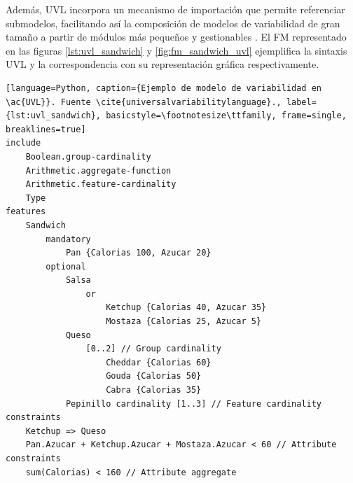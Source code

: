 Además, \ac{UVL} incorpora un mecanismo de importación que permite referenciar submodelos, 
facilitando así la composición de modelos de variabilidad de gran tamaño a partir de módulos 
más pequeños y gestionables \citep{universalvariabilitylanguage}. El \ac{FM} representado en 
las figuras \ref{lst:uvl_sandwich} y \ref{fig:fm_sandwich_uvl}
ejemplifica la sintaxis \ac{UVL} y la correspondencia con su representación gráfica respectivamente.

\begin{lstlisting}[language=Python, caption={Ejemplo de modelo de variabilidad en \ac{UVL}}. Fuente \cite{universalvariabilitylanguage}., label={lst:uvl_sandwich}, basicstyle=\footnotesize\ttfamily, frame=single, breaklines=true]
include
    Boolean.group-cardinality
    Arithmetic.aggregate-function
    Arithmetic.feature-cardinality
    Type
features
    Sandwich
        mandatory
            Pan {Calorias 100, Azucar 20}
        optional
            Salsa
                or
                    Ketchup {Calorias 40, Azucar 35}
                    Mostaza {Calorias 25, Azucar 5}
            Queso
                [0..2] // Group cardinality
                    Cheddar {Calorias 60}
                    Gouda {Calorias 50}
                    Cabra {Calorias 35}
            Pepinillo cardinality [1..3] // Feature cardinality            
constraints
    Ketchup => Queso
    Pan.Azucar + Ketchup.Azucar + Mostaza.Azucar < 60 // Attribute constraints
    sum(Calorias) < 160 // Attribute aggregate
\end{lstlisting}

